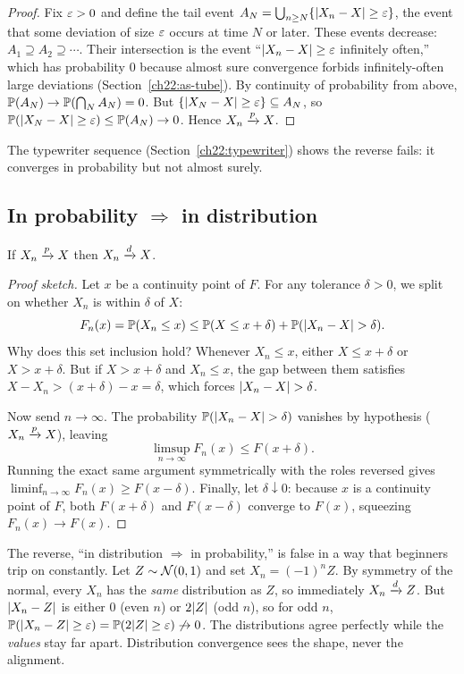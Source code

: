 \begin{proof}
Fix $\eps>0$ and define the tail event $A_N = \bigcup_{n\ge N}\set{\abs{X_n-X}\ge\eps}$,
the event that some deviation of size $\eps$ occurs at time $N$ or later. These events
decrease: $A_1 \supseteq A_2 \supseteq \cdots$. Their intersection is the event
``$\abs{X_n - X}\ge\eps$ infinitely often,'' which has probability $0$ because almost
sure convergence forbids infinitely-often large deviations
(Section~\ref{ch22:as-tube}). By continuity of probability from above,
$\P(A_N)\to\P(\bigcap_N A_N)=0$. But $\set{\abs{X_N-X}\ge\eps}\subseteq A_N$, so
$\P(\abs{X_N-X}\ge\eps)\le\P(A_N)\to0$. Hence $X_n\pto X$.
\end{proof}

The typewriter sequence (Section~\ref{ch22:typewriter}) shows the reverse fails: it
converges in probability but not almost surely.

\subsection{In probability \texorpdfstring{$\Rightarrow$}{=>} in distribution}
\label{ch22:p-imp-d}

\begin{theorem}
\label{ch22:thm-p-d}
If $X_n\pto X$ then $X_n\dto X$.
\end{theorem}

\begin{proof}[Proof sketch]
Let $x$ be a continuity point of $F$. For any tolerance $\delta>0$, we split on whether
$X_n$ is within $\delta$ of $X$:
\[
  F_n(x)=\P(X_n\le x)
  \le \P(X\le x+\delta) + \P(\abs{X_n - X} > \delta).
\]
Why does this set inclusion hold? Whenever $X_n \le x$, either $X \le x+\delta$ or
$X > x+\delta$. But if $X > x+\delta$ and $X_n \le x$, the gap between them satisfies
$X - X_n > (x+\delta) - x = \delta$, which forces $\abs{X_n - X} > \delta$.

Now send $n\to\infty$. The probability $\P(\abs{X_n - X} > \delta)$ vanishes by
hypothesis ($X_n \pto X$), leaving
\[
  \limsup_{n\to\infty} F_n(x) \le F(x+\delta).
\]
Running the exact same argument symmetrically with the roles reversed gives
$\liminf_{n\to\infty} F_n(x) \ge F(x-\delta)$. Finally, let $\delta \downarrow 0$:
because $x$ is a continuity point of $F$, both $F(x+\delta)$ and $F(x-\delta)$ converge
to $F(x)$, squeezing $F_n(x) \to F(x)$.
\end{proof}

\begin{trapbox}
The reverse, ``in distribution $\Rightarrow$ in probability,'' is false in a way that
beginners trip on constantly. Let $Z\sim\Normal(0,1)$ and set $X_n = (-1)^n Z$. By
symmetry of the normal, every $X_n$ has the \emph{same} distribution as $Z$, so
immediately $X_n\dto Z$. But $\abs{X_n - Z}$ is either $0$ (even $n$) or $2\abs{Z}$
(odd $n$), so for odd $n$, $\P(\abs{X_n - Z}\ge\eps)=\P(2\abs Z\ge\eps)\not\to0$. The
distributions agree perfectly while the \emph{values} stay far apart. Distribution
convergence sees the shape, never the alignment.
\end{trapbox}

